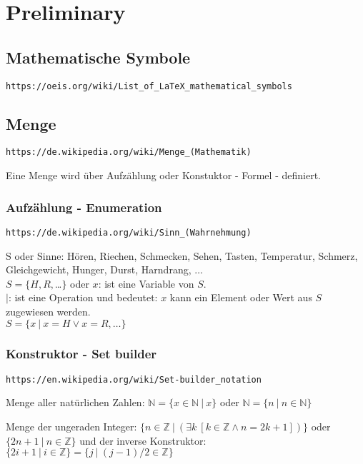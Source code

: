\documentclass[10pt,a4paper]{article}
\begin{document}
\section {Preliminary}

\newcommand{\N}{\mathbb{N}} %
\newcommand{\Z}{\mathbb{Z}} %

\subsection {Mathematische Symbole}

\verb+https://oeis.org/wiki/List_of_LaTeX_mathematical_symbols+

\subsection {Menge}

\verb+https://de.wikipedia.org/wiki/Menge_(Mathematik)+
\vskip 8pt

Eine Menge wird über Aufzählung oder Konstuktor - Formel - definiert.

\subsubsection {Aufzählung - Enumeration}

\verb+https://de.wikipedia.org/wiki/Sinn_(Wahrnehmung)+
\vskip 8pt

S oder Sinne: Hören, Riechen, Schmecken, Sehen, Tasten, Temperatur, Schmerz,
Gleichgewicht, Hunger, Durst, Harndrang, $\ldots$ \\
$S = \{ H, R, $\ldots$ \}$
\vskip 8pt
oder
\vskip 8pt
$x$: ist eine Variable von $S$. \\
$|$: ist eine Operation und bedeutet: $x$ kann ein Element oder Wert aus $S$
zugewiesen werden. \\
$S = \{ x\ |\ x = H \lor x = R, \ldots \}$

\subsubsection {Konstruktor - Set builder}

\verb+https://en.wikipedia.org/wiki/Set-builder_notation+
\vskip 8pt

Menge aller natürlichen Zahlen: $\N = \{x \in \N\ |\ x \}$
\vskip 8pt
oder
\vskip 8pt
$\N = \{n\ |\ n \in \N\}$

\vskip 8pt
Menge der ungeraden Integer: $\{n \in \Z\ |\ (\exists k\ [k \in \Z \land n = 2k + 1])\}$
\vskip 8pt
oder
\vskip 8pt
$\{2n + 1\ |\ n \in \Z\}$
\vskip 8pt
und der inverse Konstruktor:
$\{ 2i + 1\ |\ i \in \Z \} = \{ j\ |\ (j - 1) / 2 \in \Z \}$
\end{document}
